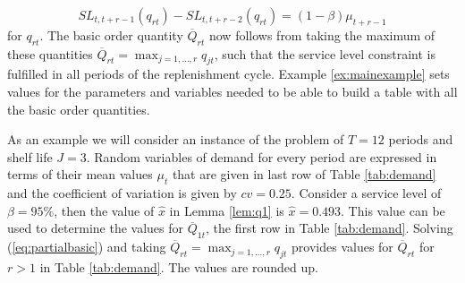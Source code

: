 \begin{equation}
\label{eq:partialbasic}
SL_{t,t+r-1}(q_{rt})-SL_{t,t+r-2}(q_{rt})=(1-\beta)\mu_{t+r-1}
 \end{equation}
 for $q_{rt}$. The basic order quantity $\overline Q_{rt}$ now follows from taking the maximum of these quantities $\overline Q_{rt}=\max_{j=1,\ldots,r}q_{jt}$, such that the service level constraint is fulfilled in all periods of the replenishment cycle. Example \ref{ex:mainexample} sets values for the parameters and variables needed to be able to build a table with all the basic order quantities.



\begin{example}
\label{ex:mainexample}



As an example we will consider an instance of the problem of $T=12$ periods and shelf life $J=3$.
Random variables of demand for every period are expressed in terms of their mean values $\mu_t$ that are given in last row of Table \ref{tab:demand} and the coefficient of variation is given by $cv=0.25$. Consider a service level of $\beta=95\%$, then the value of $\hat x$ in Lemma \ref{lem:q1} is $\hat x=0.493$. This value can be used to determine the values for $\overline Q_{1t}$, the first row in Table \ref{tab:demand}. Solving (\ref{eq:partialbasic}) and taking  $\overline Q_{rt}=\max_{j=1,\ldots,r}q_{jt}$ provides values for $\overline Q_{rt}$ for $r>1$ in Table \ref{tab:demand}. The values are rounded up.
%
\end{example}


